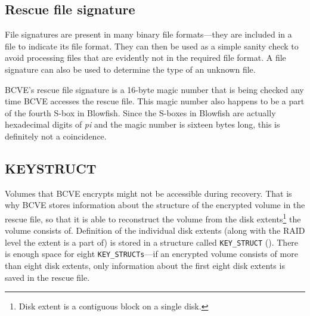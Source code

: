 \documentclass[thesis=B,english]{FITthesis}[2012/10/20]
\begin{document}
	\subsection{Rescue file signature}
	
	File signatures are present in many binary file formats---they are included in a file to indicate its file format. They can then be used as a simple sanity check to avoid processing files that are evidently not in the required file format. A file signature can also be used to determine the type of an unknown file.  
	
	BCVE's rescue file signature is a 16-byte magic number that is being checked any time BCVE accesses the rescue file. This magic number also happens to be a part of the fourth S-box in Blowfish. Since the S-boxes in Blowfish are actually hexadecimal digits of \textit{pi} \cite{blowfish} and the magic number is sixteen bytes long, this is definitely not a coincidence. 
	
	\subsection{KEY\textunderscore{}STRUCT}
	
	Volumes that BCVE encrypts might not be accessible during recovery. That is why BCVE stores information about the structure of the encrypted volume in the rescue file, so that it is able to reconstruct the volume from the disk extents\footnote{Disk extent is a contiguous block on a single disk.} the volume consists of. Definition of the individual disk extents (along with the RAID level the extent is a part of) is stored in a structure called \verb|KEY_STRUCT| (). There is enough space for eight \verb|KEY_STRUCTs|---if an encrypted volume consists of more than eight disk extents, only information about the first eight disk extents is saved in the rescue file.
	
\end{document}
